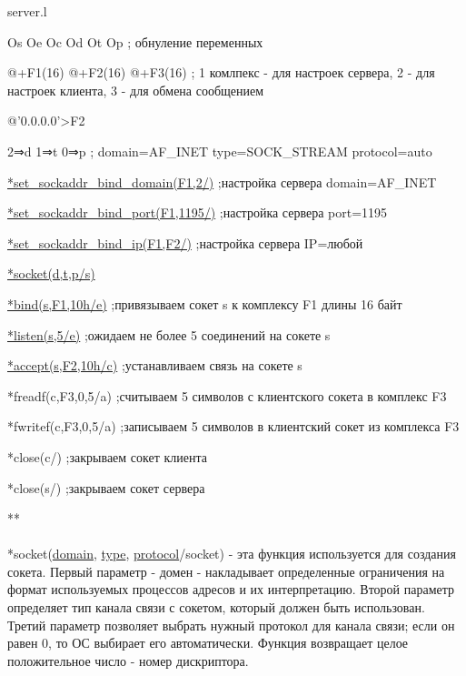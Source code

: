\documentclass[12t]{article}
\begin{document}
\textcolor[rgb]{1,0,0}{server.l}

Os Oe Oc Od Ot Op ; обнуление переменных

@+F1(16) @+F2(16) @+F3(16) ; 1 комлпекс - для настроек сервера, 2 - для настроек клиента, 3 - для обмена сообщением

@'0.0.0.0'>F2

2⇒d 1⇒t 0⇒p ; domain=AF\_INET type=SOCK\_STREAM protocol=auto

\hyperref [sockaddr] {*set\_sockaddr\_bind\_domain(F1,2/)} ;настройка сервера domain=AF\_INET 

\hyperref [sockaddr] {*set\_sockaddr\_bind\_port(F1,1195/)} ;настройка сервера port=1195

\hyperref [sockaddr] {*set\_sockaddr\_bind\_ip(F1,F2/)} ;настройка сервера IP=любой

\hyperref [socket] {*socket(d,t,p/s)}

\hyperref [bind] {*bind(s,F1,10h/e)} ;привязываем сокет s к комплексу F1 длины 16 байт

\hyperref [listen] {*listen(s,5/e)} ;ожидаем не более 5 соединений на сокете s

\hyperref [accept] {*accept(s,F2,10h/c)} ;устанавливаем связь на сокете s

*freadf(c,F3,0,5/a) ;считываем 5 символов с клиентского сокета в комплекс F3

*fwritef(c,F3,0,5/a) ;записываем 5 символов в клиентский сокет из комплекса F3

*close(c/) ;закрываем сокет клиента

*close(s/) ;закрываем сокет сервера

**
~\\
~\\
\label{socket}
*socket(\hyperref[domain]{domain}, \hyperref[type]{type}, \hyperref[protocol]{protocol}/socket) - эта функция используется для создания сокета. Первый параметр - домен - накладывает определенные ограничения на формат используемых процессов адресов и их интерпретацию. Второй параметр определяет тип канала связи с сокетом, который должен быть использован. Третий параметр позволяет выбрать нужный протокол для канала связи; если он равен 0, то ОС выбирает его автоматически. Функция возвращает целое положительное число - номер дискриптора.
\end{document}
